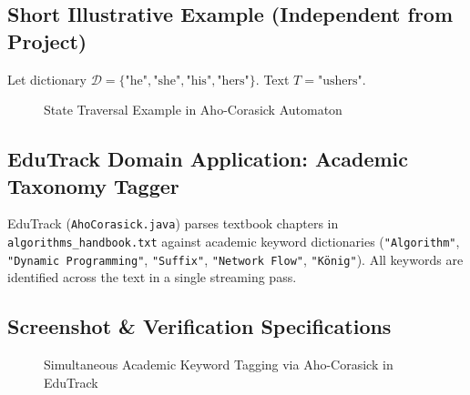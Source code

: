 \subsection{Short Illustrative Example (Independent from Project)}
Let dictionary $\mathcal{D} = \{\text{"he"}, \text{"she"}, \text{"his"}, \text{"hers"}\}$. Text $T = \text{"ushers"}$.
\begin{figure}[H]
    \centering
    \caption{State Traversal Example in Aho-Corasick Automaton}
    \label{fig:ahocorasick_trace}
\end{figure}

\subsection{EduTrack Domain Application: Academic Taxonomy Tagger}
EduTrack (\texttt{AhoCorasick.java}) parses textbook chapters in \texttt{algorithms\_handbook.txt} against academic keyword dictionaries (\texttt{"Algorithm"}, \texttt{"Dynamic Programming"}, \texttt{"Suffix"}, \texttt{"Network Flow"}, \texttt{"König"}). All keywords are identified across the text in a single streaming pass.

\subsection{Screenshot \& Verification Specifications}
\begin{figure}[H]
    \centering
    \caption{Simultaneous Academic Keyword Tagging via Aho-Corasick in EduTrack}
    \label{fig:screenshot_ac}
\end{figure}

